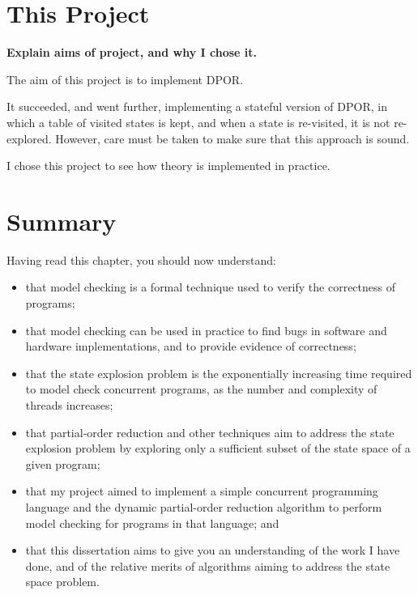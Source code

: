 \documentclass[12pt,a4paper,twoside,openright]{report}
\newenvironment{understandinglist}
	{\begin{itemize} \itemsep 0em}{\end{itemize}}
\begin{document}
\section{This Project}
\textbf{Explain aims of project, and why I
	chose it.}

The aim of this project is to implement DPOR.

It succeeded, and went further, implementing
a stateful version of DPOR, in which a table
of visited states is kept, and when a state is
re-visited, it is not re-explored. However, care
must be taken to make sure that this approach is
sound.

I chose this project to see how theory is
implemented in practice.

\section{Summary}
Having read this chapter,
you should now understand:
\begin{understandinglist}
	\item that model checking is a formal
	technique used to verify the correctness
	of programs;
	\item that model checking can be used in
	practice to find bugs in software and hardware
	implementations, and to provide evidence of
	correctness;
	\item that the state explosion problem is the
	exponentially increasing time required to model
	check concurrent programs, as the number and
	complexity of threads increases;
	\item that partial-order reduction and other
	techniques aim to address the state explosion
	problem by exploring only a sufficient subset
	of the state space of a given program;
	\item that my project aimed to implement a
	simple concurrent programming language
	and the dynamic partial-order reduction
	algorithm to perform model checking for
	programs in that language; and
	\item that this dissertation aims to give
	you an understanding of the work I have done,
	and of the relative merits of algorithms
	aiming to address the state space problem.
\end{understandinglist}
\end{document}
